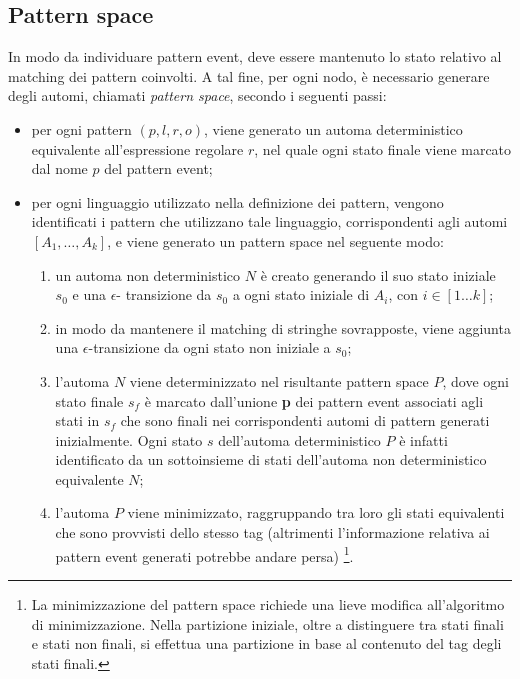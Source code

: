 \subsection{Pattern space}
In modo da individuare pattern event, deve essere mantenuto lo stato relativo al matching dei pattern coinvolti. A tal fine, per ogni nodo, è necessario generare degli automi, chiamati \emph{pattern space}, secondo i seguenti passi:
\begin{itemize}
\item per ogni pattern $(p,l,r,o)$, viene generato un automa deterministico equivalente all'espressione regolare $r$, nel quale ogni stato finale viene marcato dal nome $p$ del pattern event;
\item per ogni linguaggio utilizzato nella definizione dei pattern, vengono identificati i pattern che utilizzano tale linguaggio, corrispondenti agli automi $[A_1, \ldots , A_k]$, e viene generato un pattern space nel seguente modo:
	\begin{enumerate}
	\item un automa non deterministico $N$ è creato generando il suo stato iniziale $s_0$ e una $\epsilon$-			transizione da $s_0$ a ogni stato iniziale di $A_i$, con $i \in [1 \ldots k]$;
	\item in modo da mantenere il matching di stringhe sovrapposte, viene aggiunta una $\epsilon$-transizione	da ogni stato non iniziale a $s_0$;
	\item l'automa $N$ viene determinizzato nel risultante pattern space $P$, dove ogni stato finale $s_f$ è marcato dall'unione \textbf{p} dei pattern event associati agli stati in $s_f$ che sono finali nei corrispondenti automi di pattern generati inizialmente. Ogni stato $s$ dell'automa deterministico $P$ è infatti identificato da un sottoinsieme di stati dell'automa non deterministico equivalente $N$;
	\item l'automa $P$ viene minimizzato, raggruppando tra loro gli stati equivalenti che sono provvisti dello stesso tag (altrimenti l'informazione relativa ai pattern event generati potrebbe andare persa) \footnote{La minimizzazione del pattern space richiede una lieve modifica all'algoritmo di minimizzazione. Nella partizione iniziale, oltre a distinguere tra stati finali e stati non finali, si effettua una partizione in base al contenuto del tag degli stati finali.}.
	\end{enumerate}
\end{itemize}

